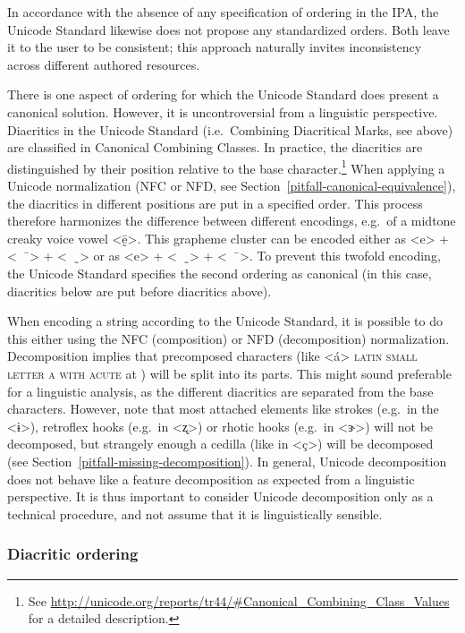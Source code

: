 In accordance with the absence of any specification of ordering in the IPA, the
Unicode Standard likewise does not propose any standardized orders. Both leave it
to the user to be consistent; this approach naturally invites inconsistency across 
different authored resources.

There is one aspect of ordering for which
the Unicode Standard does present a canonical solution. However, it is uncontroversial
from a linguistic perspective. Diacritics in the Unicode Standard
(i.e.~Combining Diacritical Marks, see above) are classified in Canonical
Combining Classes. In practice, the diacritics are distinguished by their
position relative to the base character.\footnote{See
\url{http://unicode.org/reports/tr44/\#Canonical\_Combining\_Class\_Values} for a
detailed description.} When applying a Unicode normalization (NFC or NFD, see
Section~\ref{pitfall-canonical-equivalence}), the diacritics in different
positions are put in a specified order. This process therefore harmonizes the
difference between different encodings, e.g.\ of a midtone creaky voice
vowel <ḛ̄>. This grapheme cluster can be encoded either as <e> + <\ \ ̄> + <\ \
̰> or as <e> + <\ \ ̰> + <\ \ ̄>. To prevent this twofold encoding, the Unicode
Standard specifies the second ordering as canonical (in this case, diacritics
below are put before diacritics above).

When encoding a string according to the Unicode Standard, it is possible to do
this either using the NFC (composition) or NFD (decomposition) normalization.
Decomposition implies that precomposed characters (like <á> \textsc{latin small
letter a with acute} at \uni{00E1}) will be split into its parts. This might
sound preferable for a linguistic analysis, as the different diacritics are
separated from the base characters. However, note that most attached elements
like strokes (e.g.~in the <ɨ>), retroflex hooks (e.g.~in <ʐ>) or rhotic hooks
(e.g.~in <ɝ>) will not be decomposed, but strangely enough a cedilla (like in
<ç>) will be decomposed (see Section~\ref{pitfall-missing-decomposition}). In
general, Unicode decomposition does not behave like a feature decomposition as
expected from a linguistic perspective. It is thus important to consider Unicode
decomposition only as a technical procedure, and not assume that it is
linguistically sensible.

\subsubsection*{Diacritic ordering}


